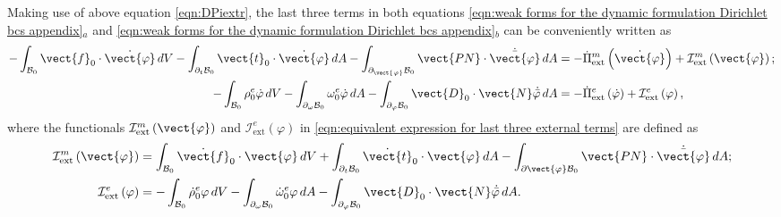 Making use of above equation \eqref{eqn:DPiextr}, the last three terms in both equations \eqref{eqn:weak forms for the dynamic formulation Dirichlet bcs appendix}$_a$ and \eqref{eqn:weak forms for the dynamic formulation Dirichlet bcs appendix}$_b$ can be conveniently written as
%
\begin{equation}\label{eqn:equivalent expression for last three external terms appendix}
\begin{aligned}
-\int_{\mathcal{B}_0}\vect{f}_0\cdot\dot{\vect{\varphi}}\,dV
-\int_{\partial_t\mathcal{B}_0}\vect{t}_0\cdot\dot{\vect{\varphi}}\,dA - \int_{\partial_{\vect{\varphi}}\mathcal{B}_0}\vect{PN}\cdot\dot{\bar{\vect{\varphi}}}\,dA& = -\dot{\Pi}^m_{\text{ext}}\left(\dot{\vect{\varphi}}\right) + \mathcal{I}^m_{\text{ext}}\left(\vect{\varphi}\right);\\
%
%
-\int_{\mathcal{B}_0}{\rho}^e_0\dot{\varphi}\,dV
-\int_{\partial_{\omega}\mathcal{B}_0}{\omega}^e_0\dot{\varphi}\,dA - \int_{\partial_{\varphi}\mathcal{B}_0}\vect{D}_0\cdot\vect{N}\dot{\bar{\varphi}}\,dA& = -\dot{\Pi}^e_{\text{ext}}\left(\dot{\varphi}\right) + \mathcal{I}^e_{\text{ext}}\left(\varphi\right),
%
\end{aligned}
\end{equation}
%
where the functionals $\mathcal{I}^m_{\text{ext}}\left(\vect{\varphi}\right)$ and $\mathcal{I}^e_{\text{ext}}\left(\varphi\right)$ in \eqref{eqn:equivalent expression for last three external terms} are defined as
%
\begin{equation}\label{eqn:functionals Im and Ie appendix}
\begin{aligned}
\mathcal{I}^m_{\text{ext}}\left(\vect{\varphi}\right) &= \int_{\mathcal{B}_0}\dot{\vect{f}}_0\cdot{\vect{\varphi}}\,dV + 
\int_{\partial_{t}\mathcal{B}_0}\dot{\vect{t}}_0\cdot{\vect{\varphi}}\,dA - \int_{\partial \vect{\varphi}\mathcal{B}_0}\vect{PN}\cdot\dot{\bar{\vect{\varphi}}}\,dA;\\
%
\mathcal{I}^e_{\text{ext}}\left({\varphi}\right) &= -\int_{\mathcal{B}_0}\dot{\rho}^e_0{{\varphi}}\,dV -
\int_{\partial_{\omega}\mathcal{B}_0}\dot{\omega}^e_0{\varphi}\,dA - \int_{\partial_{\varphi}\mathcal{B}_0}\vect{D}_0\cdot\vect{N}\dot{\bar{{\varphi}}}\,dA.
%
\end{aligned}
%
\end{equation}
%

